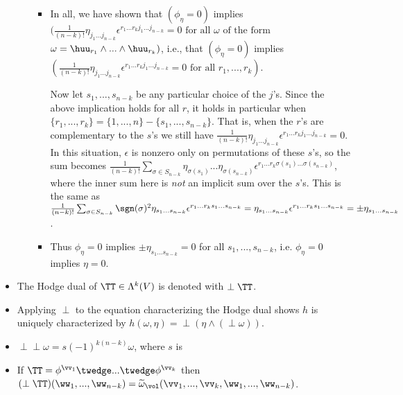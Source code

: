 \begin{itemize}
\begin{itemize}
\begin{itemize}
			\item In all, we have shown that $(\phi_\eta = 0)$ implies $(\frac{1}{(n - k)!} \eta_{j_1 ... j_{n - k}} \epsilon^{r_1 ... r_k j_1 ... j_{n - k}} = 0 \text{ for all $\omega$ of the form}$ \\ $\omega = \huu_{r_1} \wedge ... \wedge \huu_{r_k})$, i.e., that $(\phi_\eta = 0)$ implies $(\frac{1}{(n - k)!} \eta_{j_1 ... j_{n - k}} \epsilon^{r_1 ... r_k j_1 ... j_{n - k}} = 0 \text{ for all $r_1, ..., r_k$})$.
			
			Now let $s_1, ..., s_{n - k}$ be any particular choice of the $j$'s. Since the above implication holds for all $r$, it holds in particular when $\{r_1, ..., r_k\} = \{1, ..., n\} - \{s_1, ..., s_{n - k}\}$. That is, when the $r$'s are complementary to the $s$'s we still have $\frac{1}{(n - k)!} \eta_{j_1 ... j_{n - k}} \epsilon^{r_1 ... r_k j_1 ... j_{n - k}} = 0$. In this situation, $\epsilon$ is nonzero only on permutations of these $s$'s, so the sum becomes $\frac{1}{(n - k)!} \sum_{\sigma \in S_{n - k}} \eta_{\sigma(s_1)} ... \eta_{\sigma(s_{n - k})} \epsilon^{r_1 ... r_k \sigma(s_1) ... \sigma(s_{n - k})}$, where the inner sum here is \textit{not} an implicit sum over the $s$'s. This is the same as \\ $\frac{1}{(n - k)!} \sum_{\sigma \in S_{n - k}} \sgn(\sigma)^2 \eta_{s_1 ... s_{n - k}} \epsilon^{r_1 ... r_k s_1 ... s_{n - k}} = \eta_{s_1 ... s_{n - k}} \epsilon^{r_1 ... r_k s_1 ... s_{n - k}} = \pm \eta_{s_1 ... s_{n - k}}$. 
			
			\item Thus $\phi_\eta = 0$ implies $\pm \eta_{s_1 ... s_{n - k}} = 0$ for all $s_1, ..., s_{n - k}$, i.e. $\phi_\eta = 0$ implies $\eta = 0$.
		\end{itemize}
	\end{itemize}
	\item The Hodge dual of $\TT \in \Lambda^k(V)$ is denoted with $\perp \TT$.
	\item Applying $\perp$ to the equation characterizing the Hodge dual shows $h$ is uniquely characterized by $h(\omega, \eta) = \perp(\eta \wedge (\perp \omega))$.
	\item $\perp \perp 
	\omega = s (-1)^{k(n - k)} \omega$, where $s$ is
	\item If $\TT = \phi^{\vv_1} \twedge ... \twedge \phi^{\vv_k}$ then $(\perp \TT)(\ww_1, ..., \ww_{n - k}) = \widetilde{\omega}_\vol(\vv_1, ..., \vv_k, \ww_1, ..., \ww_{n - k})$.
\end{itemize}

